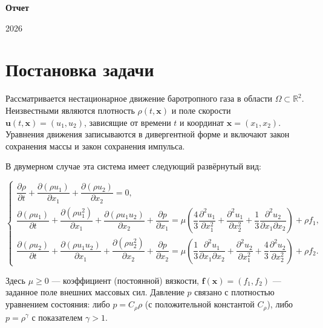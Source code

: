 \documentclass[a4paper,12pt]{extarticle}
\begin{document}
	
\begin{titlepage}
	\centering
	\vspace*{2cm}
	
	{\LARGE \textbf{Отчет}}
	\vspace{3cm}
	
	\vfill
	{\small 2026}
\end{titlepage}
\newpage
\tableofcontents
\newpage
	
\section {Постановка задачи}

Рассматривается нестационарное движение баротропного газа в области $\Omega \subset \mathbb{R}^2$. Неизвестными являются плотность $\rho(t,\mathbf{x})$ и поле скорости $\mathbf{u}(t,\mathbf{x}) = (u_1, u_2)$, зависящие от времени $t$ и координат $\mathbf{x} = (x_1, x_2)$. Уравнения движения записываются в дивергентной форме и включают закон сохранения массы и закон сохранения импульса.

В двумерном случае эта система имеет следующий развёрнутый вид:

\[
\begin{cases}
	\dfrac{\partial \rho}{\partial t} + \dfrac{\partial (\rho u_1)}{\partial x_1} + \dfrac{\partial (\rho u_2)}{\partial x_2} = 0, \\[10pt]
	\dfrac{\partial (\rho u_1)}{\partial t} + \dfrac{\partial (\rho u_1^2)}{\partial x_1} + \dfrac{\partial (\rho u_1 u_2)}{\partial x_2} + \dfrac{\partial p}{\partial x_1}
	= \mu \left( \dfrac{4}{3}\dfrac{\partial^2 u_1}{\partial x_1^2} + \dfrac{\partial^2 u_1}{\partial x_2^2} + \dfrac{1}{3}\dfrac{\partial^2 u_2}{\partial x_1 \partial x_2} \right) + \rho f_1, \\[10pt]
	\dfrac{\partial (\rho u_2)}{\partial t} + \dfrac{\partial (\rho u_1 u_2)}{\partial x_1} + \dfrac{\partial (\rho u_2^2)}{\partial x_2} + \dfrac{\partial p}{\partial x_2}
	= \mu \left( \dfrac{1}{3}\dfrac{\partial^2 u_1}{\partial x_1 \partial x_2} + \dfrac{\partial^2 u_2}{\partial x_1^2} + \dfrac{4}{3}\dfrac{\partial^2 u_2}{\partial x_2^2} \right) + \rho f_2.
\end{cases}
\]

Здесь $\mu \ge 0$ — коэффициент (постоянной) вязкости, $\mathbf{f}(\mathbf{x}) = (f_1, f_2)$ — заданное поле внешних массовых сил. Давление $p$ связано с плотностью уравнением состояния: либо $p = C_\rho \rho$ (с положительной константой $C_\rho$), либо $p = \rho^\gamma$ с показателем $\gamma > 1$.
\end{document}
